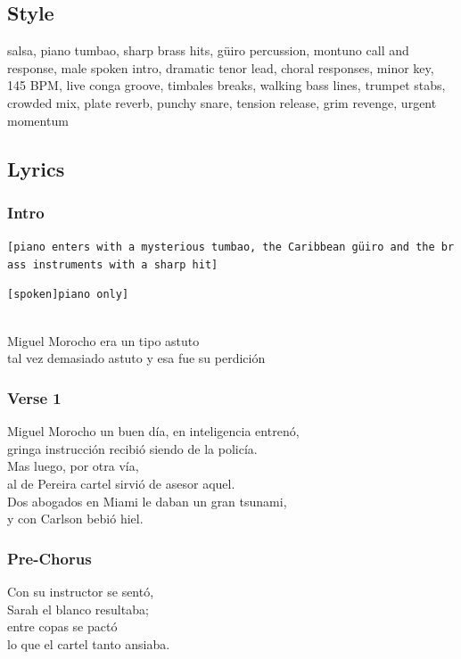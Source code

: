 \subsection{Style}\label{style-19}

salsa, piano tumbao, sharp brass hits, güiro percussion, montuno call
and response, male spoken intro, dramatic tenor lead, choral responses,
minor key, 145 BPM, live conga groove, timbales breaks, walking bass
lines, trumpet stabs, crowded mix, plate reverb, punchy snare, tension
release, grim revenge, urgent momentum

\subsection{Lyrics}\label{lyrics-19}

\subsubsection{Intro}\label{intro-1}

\texttt{{[}piano\ enters\ with\ a\ mysterious\ tumbao,\ the\ Caribbean\ güiro\ and\ the\ brass\ instruments\ with\ a\ sharp\ hit{]}}

\texttt{{[}spoken{]}\textasciigrave{}\textasciigrave{}{[}piano\ only{]}}\strut \\
Miguel Morocho era un tipo astuto\\
tal vez demasiado astuto y esa fue su perdición

\subsubsection{Verse 1}\label{verse-1-15}

Miguel Morocho un buen día, en inteligencia entrenó,\\
gringa instrucción recibió siendo de la policía.\\
Mas luego, por otra vía,\\
al de Pereira cartel sirvió de asesor aquel.\\
Dos abogados en Miami le daban un gran tsunami,\\
y con Carlson bebió hiel.

\subsubsection{Pre-Chorus}\label{pre-chorus-22}

Con su instructor se sentó,\\
Sarah el blanco resultaba;\\
entre copas se pactó\\
lo que el cartel tanto ansiaba.

